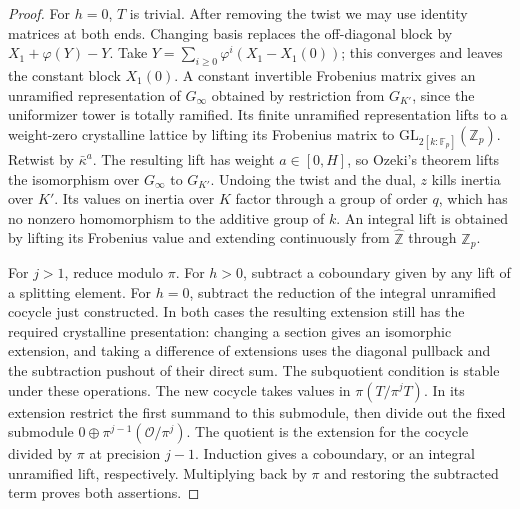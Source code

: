 \documentclass[a4paper,11pt]{article}
\theoremstyle{definition}
\theoremstyle{remark}
\newcommand{\ZZ}{\mathbb Z}\newcommand{\ord}{\operatorname{ord}}
\numberwithin{equation}{section}
\begin{document}
\begin{proof}
For \(h=0\), \(T\) is trivial. After removing the twist we may
use identity matrices at both ends. Changing basis replaces the
off-diagonal block by \(X_1+\varphi(Y)-Y\). Take
\(Y=\sum_{i\ge0}\varphi^i(X_1-X_1(0))\); this converges and
leaves the constant block \(X_1(0)\). A constant invertible
Frobenius matrix gives an unramified representation of \(G_\infty\)
obtained by restriction from \(G_{K'}\), since the uniformizer tower
is totally ramified. Its finite unramified representation lifts to
a weight-zero crystalline lattice by lifting its Frobenius matrix
to \(\mathrm{GL}_{2[k:\mathbb F_p]}(\ZZ_p)\). Retwist by
\(\bar\kappa^a\). The resulting lift has weight \(a\in[0,H]\),
so Ozeki's theorem lifts the isomorphism over \(G_\infty\) to
\(G_{K'}\). Undoing the twist and the dual, \(z\) kills inertia
over \(K'\). Its values on inertia over \(K\) factor through a
group of order \(q\), which has no nonzero homomorphism to the
additive group of \(k\). An integral lift is obtained by lifting
its Frobenius value and extending continuously from
\(\widehat{\ZZ}\) through \(\ZZ_p\).

For \(j>1\), reduce modulo \(\pi\). For \(h>0\), subtract a
coboundary given by any lift of a splitting element. For \(h=0\),
subtract the reduction of the integral unramified cocycle just
constructed. In both cases the resulting extension still has the
required crystalline presentation: changing a section gives an
isomorphic extension, and taking a difference of extensions uses
the diagonal pullback and the subtraction pushout of their direct
sum. The subquotient condition is stable under these operations.
The new cocycle takes values in \(\pi(T/\pi^jT)\). In its extension
restrict the first summand to this submodule, then divide out the
fixed submodule \(0\oplus\pi^{j-1}(\mathcal O/\pi^j)\).
The quotient is the extension for the cocycle divided by \(\pi\)
at precision \(j-1\). Induction gives a coboundary, or an integral
unramified lift, respectively. Multiplying back by \(\pi\) and
restoring the subtracted term proves both assertions.
\end{proof}
\end{document}
